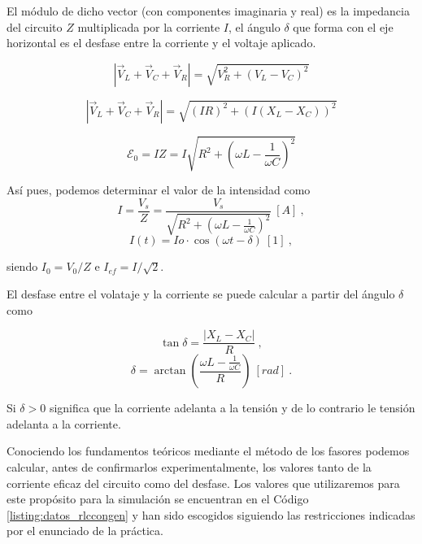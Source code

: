 \documentclass[journal]{IEEEtran}
\begin{document}
El módulo de dicho vector (con componentes imaginaria y real) es la impedancia del circuito $Z$ multiplicada por la corriente $I$, el ángulo $\delta$ que forma con el eje horizontal es el desfase entre la corriente y el voltaje aplicado.

\begin{equation}
|\vec{V}_L + \vec{V}_C + \vec{V}_R| = \sqrt{V_R^2 + (V_L - V_C)^2}
\end{equation}

\begin{equation}
|\vec{V}_L + \vec{V}_C + \vec{V}_R| = \sqrt{(IR)^2 + (I(X_L - X_C))^2}
\end{equation}

\begin{equation}
\mathcal{E}_0 = IZ = I\sqrt{R^2 + (\omega L - \frac{1}{\omega C})^2}
\end{equation}

Así pues, podemos determinar el valor de la intensidad como
\begin{equation}
I = \frac{V_s}{Z} = \frac{V_s}{\sqrt{R^2 + (\omega L - \frac{1}{\omega C})^2}}~[A]~,
\end{equation}
\begin{equation}
I(t) = Io \cdot \cos{(\omega t - \delta)}~[1]~,
\end{equation}

siendo $I_0 = V_0 / Z$ e $I_{ef}=I/\sqrt{2}$.

El desfase entre el volataje y la corriente se puede calcular a partir del ángulo $\delta$ como

\begin{equation}
\tan{\delta} = \frac{|X_L - X_C|}{R}~,
\end{equation}
\begin{equation}
\delta = \arctan{(\frac{\omega L - \frac{1}{\omega C}}{R})}~[rad]~.
\end{equation}

Si $\delta > 0$ significa que la corriente adelanta a la tensión y de lo contrario le tensión adelanta a la corriente.

Conociendo los fundamentos teóricos mediante el método de los fasores podemos calcular, antes de confirmarlos experimentalmente, los valores tanto de la corriente eficaz del circuito como del desfase. Los valores que utilizaremos para este propósito para la simulación se encuentran en el Código \ref{listing:datos_rlccongen} y han sido escogidos siguiendo las restricciones indicadas por el enunciado de la práctica.
\end{document}
